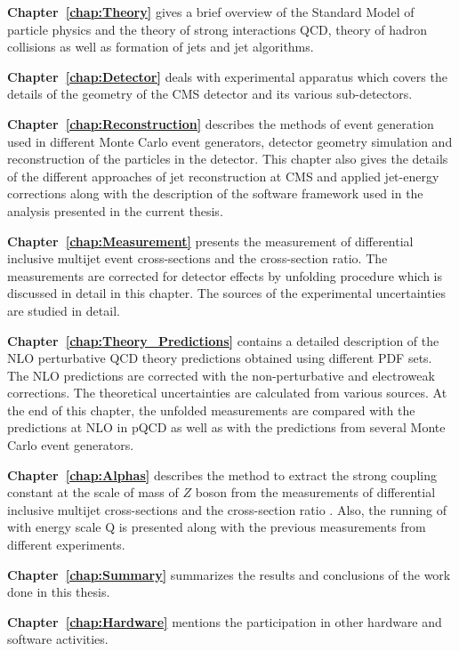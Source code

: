 {\bf Chapter~\ref{chap:Theory}} gives a brief overview of the Standard Model of particle physics and the theory of strong interactions QCD, theory of hadron collisions as well as formation of jets and jet algorithms. 

{\bf Chapter~\ref{chap:Detector}} deals with experimental apparatus which covers the details of the geometry of the CMS detector and its various sub-detectors.

{\bf Chapter~\ref{chap:Reconstruction}} describes the methods of event generation used in different Monte Carlo event generators, detector geometry simulation and reconstruction of the particles in the detector. This chapter also gives the details of the different approaches of jet reconstruction at CMS and applied jet-energy corrections along with the description of the software framework used in the analysis presented in the current thesis.

{\bf Chapter~\ref{chap:Measurement}} presents the measurement of differential inclusive multijet event cross-sections and the cross-section ratio. The measurements are corrected for detector effects by unfolding procedure which is discussed in detail in this chapter. The sources of the experimental uncertainties are studied in detail. 

{\bf Chapter~\ref{chap:Theory_Predictions}} contains a detailed description of the NLO perturbative QCD theory predictions obtained using different PDF sets. The NLO predictions are corrected with the non-perturbative and electroweak corrections. The theoretical uncertainties are calculated from various sources. At the end of this chapter, the unfolded measurements are compared with the predictions at NLO in pQCD as well as with the predictions from several Monte Carlo event generators.

{\bf Chapter~\ref{chap:Alphas}} describes the method to extract the strong coupling constant at the scale of mass of $Z$ boson \alpsmz from the measurements of differential inclusive multijet cross-sections and the cross-section ratio \ratio. Also, the running of \alps with energy scale Q is presented along with the previous measurements from different experiments.

{\bf Chapter~\ref{chap:Summary}} summarizes the results and conclusions of the work done in this thesis.

{\bf Chapter~\ref{chap:Hardware}} mentions the participation in other hardware and software activities.
